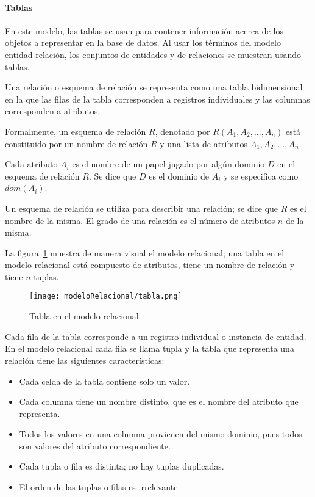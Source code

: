 \paragraph*{Tablas}
En este modelo, las tablas se usan para contener información acerca de los objetos a representar en la base de datos. Al usar los términos del modelo entidad-relación, los conjuntos de entidades y de relaciones se muestran usando tablas.


Una relación o esquema de relación se representa como una tabla bidimensional en la que las filas de la tabla corresponden a registros individuales y las columnas corresponden a atributos.

Formalmente, un esquema de relación $R$, denotado por $R(A_1, A_2,..., A_n)$ está constituido por un nombre de relación $R$ y una lista de atributos $A_1, A_2,..., A_n$. 


Cada atributo $A_i$ es el nombre de un papel jugado por algún dominio $D$ en el esquema de relación $R$. Se dice que $D$ es el dominio de $A_i$ y se especifica como $dom(A_i)$. 


Un esquema de relación se utiliza para describir una relación; se dice que $R$ es el nombre de la misma. El grado de una relación es el número de atributos $n$ de la misma.


La figura~\ref{img:modeloRelacional-Tabla} muestra de manera visual el modelo relacional; una tabla en el modelo relacional está compuesto de atributos, tiene un nombre de relación y tiene $n$ tuplas.


\begin{figure}[H]
    \centering
    \texttt{[image: modeloRelacional/tabla.png]}
    \caption{Tabla en el modelo relacional}
    \label{img:modeloRelacional-Tabla}
\end{figure} 
Cada fila de la tabla corresponde a un registro individual o instancia de entidad. En el modelo relacional cada fila se llama tupla y la tabla que representa una relación tiene las siguientes características:
\begin{itemize}
    \item Cada celda de la tabla contiene solo un valor.
    \item Cada columna tiene un nombre distinto, que es el nombre del atributo que representa.
    \item Todos los valores en una columna provienen del mismo dominio, pues todos son valores del atributo correspondiente.
    \item Cada tupla o fila es distinta; no hay tuplas duplicadas.
    \item El orden de las tuplas o filas es irrelevante.
\end{itemize}
